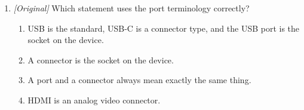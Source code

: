 \begin{enumerate}[label=\textbf{Q\arabic*.}, leftmargin=*]
\begin{enumerate}[label=\Alph*.]
    \item connecting a microphone
    \item connecting to a wired network
  \end{enumerate}
\item \textit{[Original]} Which statement uses the port terminology
  correctly?
  \begin{enumerate}[label=\Alph*.]
    \item USB is the standard, USB-C is a connector type, and the USB port is
      the socket on the device.
    \item A connector is the socket on the device.
    \item A port and a connector always mean exactly the same thing.
    \item HDMI is an analog video connector.
  \end{enumerate}


\end{enumerate}
